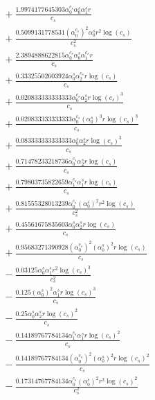 \documentclass[10pt]{article}
\begin{document}
\begin{align*}
&{}  + \frac{1.9974177645303 \alpha_{0}^{c_s} \alpha_{0}^s \alpha_{1}^s r}{c_{s}} \\
&{}  + \frac{0.5099131778531 \left(\alpha_{0}^{c_s}\right)^{2} \alpha_{0}^s r^{2} \log{\left(c_{s} \right)}}{c_{s}^{2}} \\
&{}  + \frac{2.3894888622815 \alpha_{0}^{c_s} \alpha_{0}^s \alpha_{1}^{c_s} r}{c_{s}} \\
&{}  + \frac{0.33325502603924 \alpha_{0}^s \alpha_{2}^{c_s} r \log{\left(c_{s} \right)}}{c_{s}} \\
&{}  + \frac{0.020833333333333 \alpha_{0}^{c_s} \alpha_{2}^s r \log{\left(c_{s} \right)}^{3}}{c_{s}} \\
&{}  + \frac{0.020833333333333 \alpha_{0}^{c_s} \left(\alpha_{0}^s\right)^{3} r \log{\left(c_{s} \right)}^{3}}{c_{s}} \\
&{}  + \frac{0.083333333333333 \alpha_{0}^s \alpha_{2}^s r \log{\left(c_{s} \right)}^{3}}{c_{s}} \\
&{}  + \frac{0.71478233218736 \alpha_{0}^{c_s} \alpha_{2}^s r \log{\left(c_{s} \right)}}{c_{s}} \\
&{}  + \frac{0.79803735822659 \alpha_{1}^{c_s} \alpha_{1}^s r \log{\left(c_{s} \right)}}{c_{s}} \\
&{}  + \frac{0.81555328013239 \alpha_{0}^{c_s} \left(\alpha_{0}^s\right)^{2} r^{2} \log{\left(c_{s} \right)}}{c_{s}^{2}} \\
&{}  + \frac{0.45561675835603 \alpha_{0}^s \alpha_{2}^s r \log{\left(c_{s} \right)}}{c_{s}} \\
&{}  + \frac{0.95683271390928 \left(\alpha_{0}^{c_s}\right)^{2} \left(\alpha_{0}^s\right)^{2} r \log{\left(c_{s} \right)}}{c_{s}} \\
&{}  - \frac{0.03125 \alpha_{0}^s \alpha_{1}^s r^{2} \log{\left(c_{s} \right)}^{3}}{c_{s}^{2}} \\
&{}  - \frac{0.125 \left(\alpha_{0}^s\right)^{2} \alpha_{1}^s r \log{\left(c_{s} \right)}^{3}}{c_{s}} \\
&{}  - \frac{0.25 \alpha_{0}^s \alpha_{2}^s r \log{\left(c_{s} \right)}^{2}}{c_{s}} \\
&{}  - \frac{0.14189767784134 \alpha_{1}^{c_s} \alpha_{1}^s r \log{\left(c_{s} \right)}^{2}}{c_{s}} \\
&{}  - \frac{0.14189767784134 \left(\alpha_{0}^{c_s}\right)^{2} \left(\alpha_{0}^s\right)^{2} r \log{\left(c_{s} \right)}^{2}}{c_{s}} \\
&{}  - \frac{0.17314767784134 \alpha_{0}^{c_s} \left(\alpha_{0}^s\right)^{2} r^{2} \log{\left(c_{s} \right)}^{2}}{c_{s}^{2}} \\

\end{align*}
\end{document}
